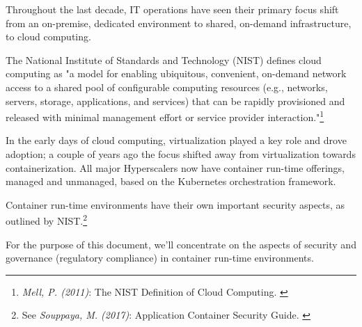 Throughout the last decade, IT operations have seen their primary focus shift from an on-premise, dedicated environment to shared, on-demand infrastructure, to cloud computing.

The National Institute of Standards and Technology (NIST) defines cloud computing as "a model for enabling ubiquitous, convenient, on-demand network access to a shared pool of configurable computing resources (e.g., networks, servers, storage, applications, and services) that can be rapidly provisioned and released with minimal management effort or service provider interaction."\footnote{\textit{Mell, P. (2011)}: The NIST Definition of Cloud Computing. \cite{sp800-145}}

In the early days of cloud computing, virtualization played a key role and drove adoption; a couple of years ago the focus shifted away from virtualization towards containerization. All major Hyperscalers now have container run-time offerings, managed and unmanaged, based on the Kubernetes orchestration framework.

Container run-time environments have their own important security aspects, as outlined by NIST.\footnote{See \textit{Souppaya, M. (2017)}: Application Container Security Guide. \cite{sp800-190}}

For the purpose of this document, we'll concentrate on the aspects of security and governance (regulatory compliance) in container run-time environments.
